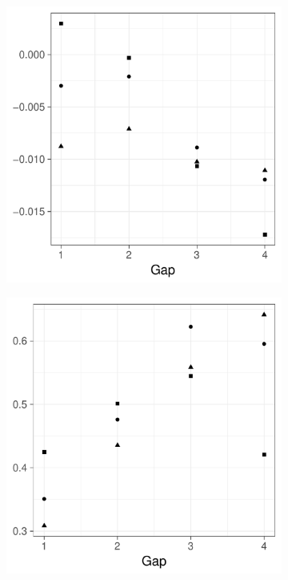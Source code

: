 \begin{figure}[htbp]
    \centering
    \begin{subfigure}[b]{0.49\textwidth}
        \includegraphics[width=\textwidth]{results/by_two_peaks/peak-bias-vs-risk-peak-gap}
        \caption{}
        \label{fig:other_measures:p1.4_100_G:peak_bias}
    \end{subfigure}
    \begin{subfigure}[b]{0.49\textwidth}
        \includegraphics[width=\textwidth]{results/by_two_peaks/peak-drift-vs-risk-peak-gap}
        \caption{}
        \label{fig:other_measures:p1.4_100_G:peak_drift}
    \end{subfigure}


\end{figure}
